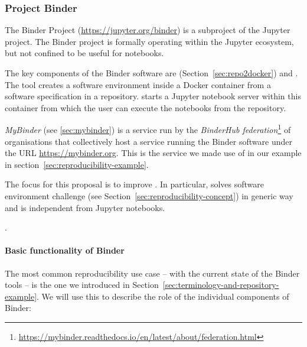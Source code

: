 \subsubsection{Project Binder}\label{seq:project-binder}

The Binder Project \cite{Binderpaper2018} (\url{https://jupyter.org/binder}) is
a subproject of the Jupyter project. The Binder project is formally operating
within the Jupyter ecosystem, but not confined to be useful for notebooks.

The key components of the Binder software are \repotodocker{}
(Section~\ref{sec:repo2docker}) and \binderhub{}. The \repotodocker{} tool
creates a software environment inside a Docker container from a software
specification in a repository. \binderhub{} starts a Jupyter notebook server
within this container from which the user can execute the notebooks from the
repository.

\emph{MyBinder} (see \ref{sec:mybinder}) is a service run by the \emph{BinderHub
  federation}\footnote{\url{https://mybinder.readthedocs.io/en/latest/about/federation.html}}
of organisations that collectively host a service running the Binder software
under the URL \url{https://mybinder.org}. This is the service we made use of in
our example in section~\ref{sec:reproducibility-example}.

The focus for this proposal is to improve \repotodocker{}. In particular,
\repotodocker{} solves software environment challenge (see
Section~\ref{sec:reproducibility-concept}) in generic way and is independent
from Jupyter notebooks.

.

\paragraph{Basic functionality of Binder}
\label{binder-how-does-it-work}

The most common reproducibility use case -- with the current state of the Binder
tools -- is the one we introduced in
Section~\ref{sec:terminology-and-repository-example}. We will use this to
describe the role of the individual components of Binder:

